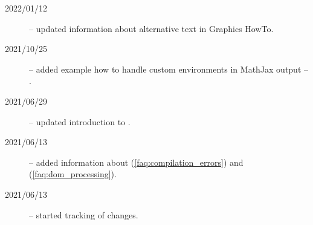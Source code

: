 \begin{description}
  \item[2022/01/12] -- updated information about alternative text in Graphics HowTo.
  \item[2021/10/25] -- added example how to handle custom environments in MathJax output -- .
  \item[2021/06/29] -- updated introduction to .
  \item[2021/06/13] -- added information  about  (\ref{faq:compilation_errors}) and  (\ref{faq:dom_processing}).
  \item[2021/06/13] -- started tracking of changes.
\end{description}

